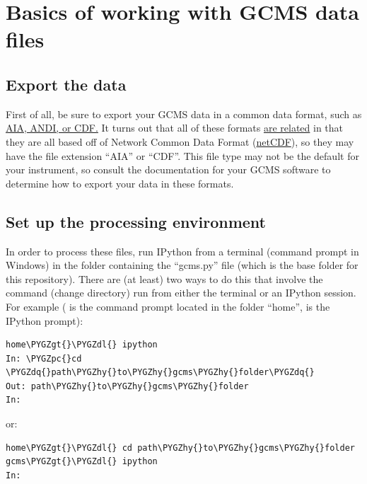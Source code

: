 \documentclass[letterpaper,10pt,english]{sphinxmanual}
\def\PYGZgt{\char`\>}
\def\PYGZpc{\char`\%}
\def\PYGZdl{\char`\$}
\def\PYGZhy{\char`\-}
\def\PYGZdq{\char`\"}
\begin{document}
\chapter{Basics of working with GCMS data files}
\label{basics:version-control-software-git}\label{basics::doc}\label{basics:basics-of-working-with-gcms-data-files}

\section{Export the data}
\label{basics:export-the-data}
First of all, be sure to export your GCMS data in a common data format, such
as \href{http://en.wikipedia.org/wiki/Mass\_spectrometry\_data\_format\#ANDI-MS\_or\_netCDF}{AIA, ANDI, or CDF.} It turns out that all of these formats \href{https://www.unidata.ucar.edu/support/help/MailArchives/netcdf/msg05748.html}{are related}
in that they are all based off of Network Common Data Format (\href{http://en.wikipedia.org/wiki/NetCDF}{netCDF}), so
they may have the file extension ``AIA'' or ``CDF''. This file type may not be the
default for your instrument, so consult the documentation for your GCMS
software to determine how to export your data in these formats.


\section{Set up the processing environment}
\label{basics:netcdf}\label{basics:set-up-the-processing-environment}
In order to process these files, run IPython from a terminal (command prompt
in Windows) in the folder containing the ``gcms.py'' file (which is the base
folder for this repository).  There are (at least) two ways to do this that
involve the command  (change directory) run from either the terminal or
an IPython session. For example ( is the command prompt located in
the folder ``home'',  is the IPython prompt):

\begin{Verbatim}[commandchars=\\\{\}]
home\PYGZgt{}\PYGZdl{} ipython
In: \PYGZpc{}cd \PYGZdq{}path\PYGZhy{}to\PYGZhy{}gcms\PYGZhy{}folder\PYGZdq{}
Out: path\PYGZhy{}to\PYGZhy{}gcms\PYGZhy{}folder
In:
\end{Verbatim}

or:

\begin{Verbatim}[commandchars=\\\{\}]
home\PYGZgt{}\PYGZdl{} cd path\PYGZhy{}to\PYGZhy{}gcms\PYGZhy{}folder
gcms\PYGZgt{}\PYGZdl{} ipython
In:
\end{Verbatim}
\end{document}
